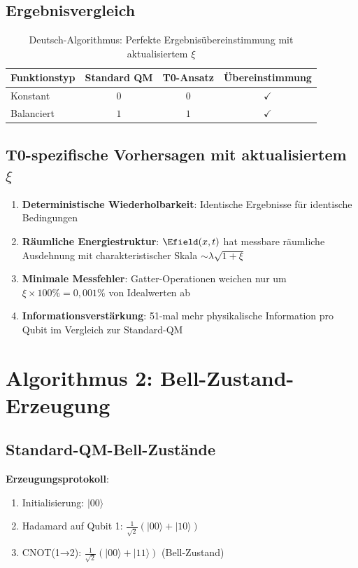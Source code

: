 	\subsection{Ergebnisvergleich}
	
	\begin{table}[htbp]
		\centering
		\begin{tabular}{lccc}
			\toprule
			\textbf{Funktionstyp} & \textbf{Standard QM} & \textbf{T0-Ansatz} & \textbf{Übereinstimmung} \\
			\midrule
			Konstant & $0$ & $0$ & $\checkmark$ \\
			Balanciert & $1$ & $1$ & $\checkmark$ \\
			\bottomrule
		\end{tabular}
		\caption{Deutsch-Algorithmus: Perfekte Ergebnisübereinstimmung mit aktualisiertem $\xi$}
	\end{table}
	
	\subsection{T0-spezifische Vorhersagen mit aktualisiertem $\xi$}
	
	\begin{enumerate}
		\item \textbf{Deterministische Wiederholbarkeit}: Identische Ergebnisse für identische Bedingungen
		\item \textbf{Räumliche Energiestruktur}: $\Efield(x,t)$ hat messbare räumliche Ausdehnung mit charakteristischer Skala $\sim \lambda \sqrt{1+\xi}$
		\item \textbf{Minimale Messfehler}: Gatter-Operationen weichen nur um $\xi \times 100\% = 0,001\%$ von Idealwerten ab
		\item \textbf{Informationsverstärkung}: 51-mal mehr physikalische Information pro Qubit im Vergleich zur Standard-QM
	\end{enumerate}
	
	\section{Algorithmus 2: Bell-Zustand-Erzeugung}
	
	\subsection{Standard-QM-Bell-Zustände}
	
	\textbf{Erzeugungsprotokoll}:
	\begin{enumerate}
		\item Initialisierung: $|00\rangle$
		\item Hadamard auf Qubit 1: $\frac{1}{\sqrt{2}}(|00\rangle + |10\rangle)$
		\item CNOT(1→2): $\frac{1}{\sqrt{2}}(|00\rangle + |11\rangle)$ (Bell-Zustand)
	\end{enumerate}
	
